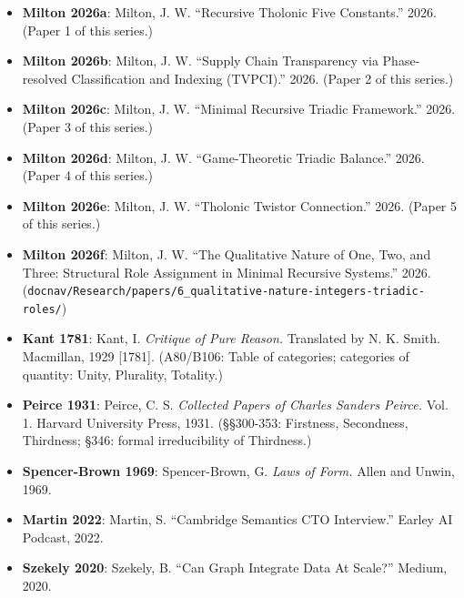 \documentclass[12pt]{article}
\providecommand{\tightlist}{%
  \setlength{\itemsep}{0pt}\setlength{\parskip}{0pt}}
\begin{document}
\begin{itemize}
\tightlist
\item
  \textbf{Milton 2026a}: Milton, J. W. ``Recursive Tholonic Five
  Constants.'' 2026. (Paper 1 of this series.)
\item
  \textbf{Milton 2026b}: Milton, J. W. ``Supply Chain Transparency via
  Phase-resolved Classification and Indexing (TVPCI).'' 2026. (Paper 2
  of this series.)
\item
  \textbf{Milton 2026c}: Milton, J. W. ``Minimal Recursive Triadic
  Framework.'' 2026. (Paper 3 of this series.)
\item
  \textbf{Milton 2026d}: Milton, J. W. ``Game-Theoretic Triadic
  Balance.'' 2026. (Paper 4 of this series.)
\item
  \textbf{Milton 2026e}: Milton, J. W. ``Tholonic Twistor Connection.''
  2026. (Paper 5 of this series.)
\item
  \textbf{Milton 2026f}: Milton, J. W. ``The Qualitative Nature of One,
  Two, and Three: Structural Role Assignment in Minimal Recursive
  Systems.'' 2026.
  (\texttt{docnav/Research/papers/6\_qualitative-nature-integers-triadic-roles/})
\item
  \textbf{Kant 1781}: Kant, I. \emph{Critique of Pure Reason.}
  Translated by N. K. Smith. Macmillan, 1929 {[}1781{]}. (A80/B106:
  Table of categories; categories of quantity: Unity, Plurality,
  Totality.)
\item
  \textbf{Peirce 1931}: Peirce, C. S. \emph{Collected Papers of Charles
  Sanders Peirce.} Vol. 1. Harvard University Press, 1931. (§§300-353:
  Firstness, Secondness, Thirdness; §346: formal irreducibility of
  Thirdness.)
\item
  \textbf{Spencer-Brown 1969}: Spencer-Brown, G. \emph{Laws of Form.}
  Allen and Unwin, 1969.
\item
  \textbf{Martin 2022}: Martin, S. ``Cambridge Semantics CTO
  Interview.'' Earley AI Podcast, 2022.
\item
  \textbf{Szekely 2020}: Szekely, B. ``Can Graph Integrate Data At
  Scale?'' Medium, 2020.
\end{itemize}
\end{document}
